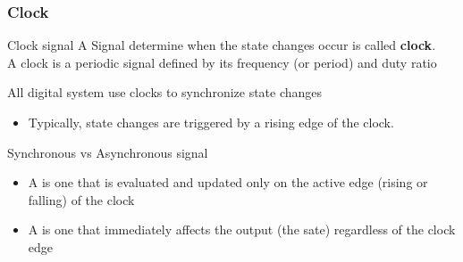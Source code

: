     
    

   \subsubsection{Clock}
   \begin{parag}{Clock signal}
       A Signal determine when the state changes occur is called \textbf{clock}.\\
       A clock is a periodic signal defined by its frequency (or period) and duty ratio \begin{framedremark}
       All digital system use clocks to synchronize state changes
       \begin{itemize}
           \item Typically, state changes are triggered by a rising edge of the clock.
       \end{itemize}
       
       \end{framedremark}

       
   \end{parag}
   \begin{parag}{Synchronous vs Asynchronous signal}
       \begin{itemize}
           \item A  is one that is evaluated and updated only on the active edge (rising or falling) of the clock
           \item A  is one that immediately affects the output (the sate) regardless of the clock edge
       \end{itemize}
       
       
   \end{parag}
   
   
    
    
    
